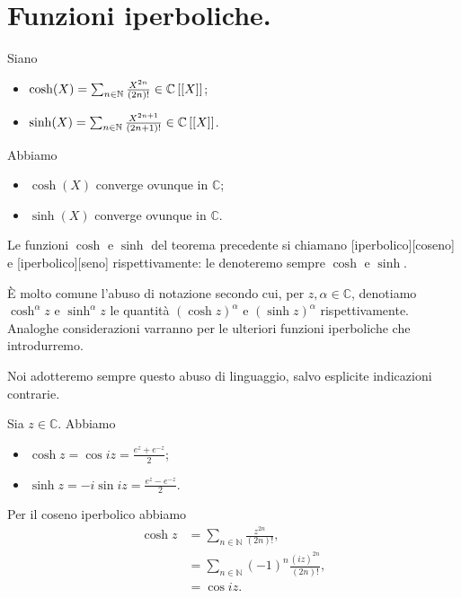 \section{Funzioni iperboliche.}
\label{FunzioniNotevoli_FunzioniIperboliche}
\begin{Theorem}
	Siano
	\begin{itemize}
		\item $\cosh(X)
          = \sum_{n \in \mathbb{N}} \frac{X^{2n}}{(2n)!}
          \in \mathbb{C} \left [ \left [ X \right ] \right ]$;
		\item $\sinh(X)
          = \sum_{n \in \mathbb{N}} \frac{X^{2n + 1}}{(2n + 1)!}
          \in \mathbb{C} \left [ \left [ X \right ] \right ]$.
	\end{itemize}
	Abbiamo
	\begin{itemize}
		\item $\cosh(X)$ converge ovunque in $\mathbb{C}$;
		\item $\sinh(X)$ converge ovunque in $\mathbb{C}$.
	\end{itemize}
\end{Theorem}
\begin{Definition}
	Le funzioni $\cosh$ e $\sinh$ del teorema precedente si chiamano
  [iperbolico][coseno] e
  [iperbolico][seno] rispettivamente: le denoteremo sempre
  $\cosh$ e $\sinh$.
\end{Definition}
\par \`E molto comune l'abuso di notazione secondo cui, per
$z, \alpha \in \mathbb{C}$, denotiamo $\cosh^\alpha{z}$ e
$\sinh^\alpha{z}$ le quantit\`a $(\cosh{z})^\alpha$ e $(\sinh z)^\alpha$
rispettivamente. Analoghe considerazioni varranno per le ulteriori
funzioni iperboliche che introdurremo.
\par Noi adotteremo sempre questo abuso di linguaggio, salvo esplicite
indicazioni contrarie.
\begin{Theorem}
  Sia $z \in \mathbb{C}$. Abbiamo
  \begin{itemize}
    \item $\cosh z
            = \cos iz
            = \frac{e^z + e^{-z}}{2}$;
    \item $\sinh z
            = - i \sin iz
            = \frac{e^z - e^{-z}}{2}$.
  \end{itemize}
\end{Theorem}
\Proof Per il coseno iperbolico abbiamo
\begin{align*}
  \cosh z
  &= \sum_{n \in \mathbb{N}} \frac{z^{2n}}{(2n)!},\\
  &= \sum_{n \in \mathbb{N}} (-1)^{n} \frac{(iz)^{2n}}{(2n)!},\\
  &= \cos iz.
\end{align*}

